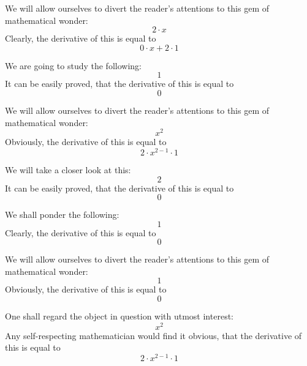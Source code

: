 \documentclass{article}
\begin{document}
We will allow ourselves to divert the reader's attentions to this gem of mathematical wonder:
\begin{equation}
2 \cdot x 
\end{equation}
Clearly, the derivative of this is equal to
\begin{equation}
0 \cdot x + 2 \cdot 1 
\end{equation}

We are going to study the following:
\begin{equation}
1 
\end{equation}
It can be easily proved, that the derivative of this is equal to
\begin{equation}
0 
\end{equation}

We will allow ourselves to divert the reader's attentions to this gem of mathematical wonder:
\begin{equation}
x ^{2 } 
\end{equation}
Obviously, the derivative of this is equal to
\begin{equation}
2 \cdot x ^{2 - 1 } \cdot 1 
\end{equation}

We will take a closer look at this:
\begin{equation}
2 
\end{equation}
It can be easily proved, that the derivative of this is equal to
\begin{equation}
0 
\end{equation}

We shall ponder the following:
\begin{equation}
1 
\end{equation}
Clearly, the derivative of this is equal to
\begin{equation}
0 
\end{equation}

We will allow ourselves to divert the reader's attentions to this gem of mathematical wonder:
\begin{equation}
1 
\end{equation}
Obviously, the derivative of this is equal to
\begin{equation}
0 
\end{equation}

One shall regard the object in question with utmost interest:
\begin{equation}
x ^{2 } 
\end{equation}
Any self-respecting mathematician would find it obvious, that the derivative of this is equal to
\begin{equation}
2 \cdot x ^{2 - 1 } \cdot 1 
\end{equation}
\end{document}
